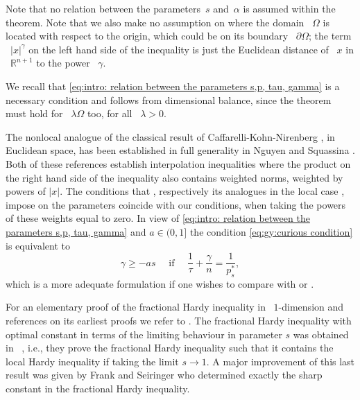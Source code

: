 \documentclass[reqno,12pt]{amsart}
\newcommand{\R}{\mathbb{R}}
\numberwithin{equation}{section}
\theoremstyle{plain}
\theoremstyle{definition}
\renewcommand{\geq}{\geqslant}
\begin{document}
Note that no relation between the parameters~$s$ and~$\alpha$ is assumed within the theorem. Note that we also make no assumption on where the domain ~$\Omega$ is located with respect to the origin, which could be on its boundary ~$\partial\Omega$; the term ~$|x|^{\gamma}$ on the left hand side of the inequality is just the Euclidean distance of ~$x$ in ~$\R^{n+1}$ to the power ~$\gamma.$

We recall that \eqref{eq:intro: relation between the parameters s,p, tau, gamma} is a necessary condition and follows from dimensional balance, since the theorem must hold for ~$\lambda\Omega$ too, for all ~$\lambda>0.$ 

The nonlocal analogue of the classical result of Caffarelli-Kohn-Nirenberg \cite{CKN}, in Euclidean space, has been established  in full generality in Nguyen and Squassina \cite{Squassina2018}. Both of these references establish interpolation inequalities where the product on the right hand side of the inequality also contains weighted norms, weighted by powers of $|x|$. The conditions that \cite{Squassina2018}, respectively its analogues in the local case \cite{CKN}, impose on the parameters coincide  with our conditions, when taking the powers of these weights equal to zero. 
In view of \eqref{eq:intro: relation between the parameters s,p, tau, gamma} and $a\in (0,1]$ the condition \eqref{eq:gy:curious condition} is equivalent to
\begin{equation*}
  \gamma\geq -as \quad\text{ if }\quad \frac{1}{\tau} + \frac{\gamma}{n} = \frac{1}{p_s^{*}},
\end{equation*} 
which is a more adequate formulation if one wishes to compare with  \cite{Squassina2018} or \cite{CKN}.








For an elementary proof of the fractional Hardy inequality in ~$1$-dimension and  references on its earliest proofs we refer to \cite[Section 3]{Hardy1Dim}. The fractional Hardy inequality with optimal constant in terms of the limiting behaviour in  parameter $s$ was obtained in ~\cite{mazya}, i.e., they prove the fractional Hardy inequality such that it contains the local Hardy inequality if taking the limit $s\to 1$.  A major improvement of this last result was given by Frank and Seiringer \cite{FrankSeiringer} who determined exactly the sharp constant in the  fractional Hardy inequality. 
\end{document}
